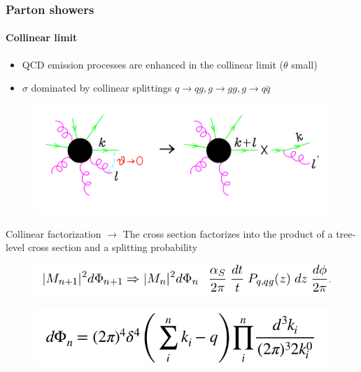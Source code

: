 \documentclass[aspectratio=43]{beamer}
\begin{document}
\begin{frame}

	\frametitle{Parton showers}
	\framesubtitle{Collinear limit}
	
	\begin{itemize} 
		\item \footnotesize QCD emission processes are enhanced in the collinear limit ($\theta$ small)
		\item \footnotesize $\sigma$ dominated by collinear splittings $q \rightarrow qg, g \rightarrow gg, g \rightarrow q\bar{q}$
	\end{itemize}
	
	\begin{figure}
		\includegraphics[width = 6 cm]{plots/collinear_factorization.png}
	\end{figure}
	
	\footnotesize Collinear factorization $\longrightarrow$ The cross section factorizes
	into the product of a tree-level cross section and a splitting probability
	\begin{figure}
		\includegraphics[width = 7 cm]{plots/eq_factorization_theorem.png}
	\end{figure}

	\begin{figure}
		\includegraphics[width = 5 cm]{plots/eq_factorization_ps.png}
	\end{figure}

\end{frame}
\end{document}

